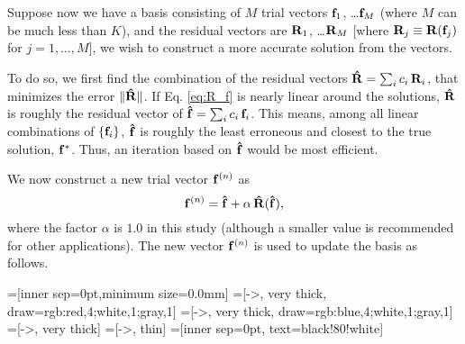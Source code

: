 \documentclass[reprint,superscriptaddress]{revtex4-1}
\begin{document}
Suppose now we have a basis consisting of $M$ trial vectors
$\mathbf{f}_1$, \dots $\mathbf{f}_M$
(where $M$ can be much less than $K$),
%
and the residual vectors are
$\mathbf{R}_1$, \dots $\mathbf{R}_M$
[where $\mathbf{R}_j \equiv \mathbf{R}(\mathbf{f}_j)$
for $j = 1, \dots, M$],
%
we wish to construct a more accurate solution
from the vectors.



To do so, we first find the combination of the residual vectors
$\mathbf{\hat R} = \sum_i c_i \, \mathbf{R}_i$,
that minimizes the error
$\| \mathbf{\hat R} \|$.
%
If Eq. \eqref{eq:R_f} is nearly linear
around the solutions,
%
$\mathbf{\hat R}$
is roughly the residual vector of
$\mathbf{\hat f} = \sum_i c_i \, \mathbf{f}_i$.
%
This means,
among all linear combinations of
$\{ \mathbf{f}_i \}$,
$\mathbf{\hat f}$
is roughly the least erroneous
and closest to the true solution,
$\mathbf{f}^*$.
%
Thus,
an iteration based on
$\mathbf{\hat f}$
would be most efficient.



We now construct a new trial vector $\mathbf{f}^{(n)}$ as
%
\begin{equation}
\mathbf{f}^{(n)}
=
\mathbf{\hat f}
+
\alpha \, \mathbf{\hat R}( \mathbf{\hat f} ),
\end{equation}
%
where the factor $\alpha$ is $1.0$ in this study
(although a smaller value is recommended
for other applications\cite{kovalenko1999, howard2011}).
%
The new vector $\mathbf{f}^{(n)}$
is used to update the basis as follows.





=[inner sep=0pt,minimum size=0.0mm]
=[->, very thick, draw={rgb:red,4;white,1;gray,1}]
=[->, very thick, draw={rgb:blue,4;white,1;gray,1}]
=[->, very thick]
=[->, thin]
=[inner sep=0pt, text=black!80!white]
\end{document}
